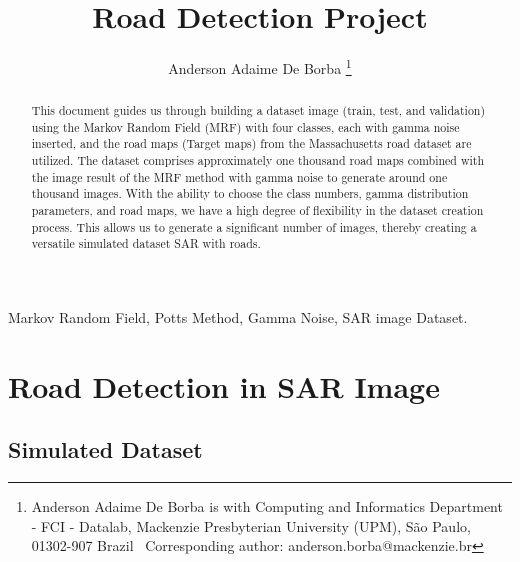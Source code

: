 \documentclass[
  journal,
]{IEEEtran}%
\title{Road Detection Project}
\author{
Anderson Adaime De
Borba\orcidlink{https://orcid.org/0000-0001-8479-9128}%
\thanks{Anderson Adaime De Borba is with Computing and Informatics
Department - FCI - Datalab, Mackenzie Presbyterian University (UPM), São
Paulo, 01302-907 Brazil%
  Corresponding author: anderson.borba@mackenzie.br
}

}
\begin{document}


\maketitle

\begin{abstract}
This document guides us through building a dataset image (train, test,
and validation) using the Markov Random Field (MRF) with four classes,
each with gamma noise inserted, and the road maps (Target maps) from the
Massachusetts road dataset are utilized. The dataset comprises
approximately one thousand road maps combined with the image result of
the MRF method with gamma noise to generate around one thousand images.
With the ability to choose the class numbers, gamma distribution
parameters, and road maps, we have a high degree of flexibility in the
dataset creation process. This allows us to generate a significant
number of images, thereby creating a versatile simulated dataset SAR
with roads.
\end{abstract}
\begin{IEEEkeywords}
Markov Random Field, Potts Method, Gamma Noise, SAR image Dataset.
\end{IEEEkeywords}

%


\section{Road Detection in SAR Image}\label{road-detection-in-sar-image}

\subsection{Simulated Dataset}\label{simulated-dataset}
\end{document}
